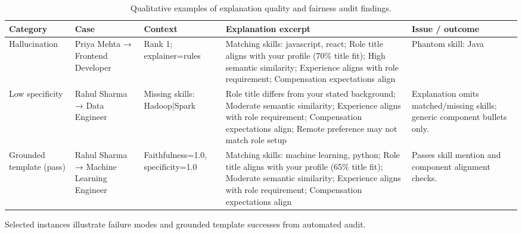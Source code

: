 \begin{table}[htbp]
\centering
\caption{Qualitative examples of explanation quality and fairness audit findings.}
\label{tab:qualitative}
\small
\begin{tabular}{p{1.6cm}p{2.2cm}p{2.5cm}p{4.5cm}p{3cm}}
\toprule
Category & Case & Context & Explanation excerpt & Issue / outcome \\
\midrule
Hallucination & Priya Mehta → Frontend Developer & Rank 1; explainer=rules & Matching skills: javascript, react; Role title aligns with your profile (70\% title fit); High semantic similarity; Experience aligns with role requirement; Compensation expectations align & Phantom skill: Java \\
Low specificity & Rahul Sharma → Data Engineer & Missing skills: Hadoop|Spark & Role title differs from your stated background; Moderate semantic similarity; Experience aligns with role requirement; Compensation expectations align; Remote preference may not match role setup & Explanation omits matched/missing skills; generic component bullets only. \\
Grounded template (pass) & Rahul Sharma → Machine Learning Engineer & Faithfulness=1.0, specificity=1.0 & Matching skills: machine learning, python; Role title aligns with your profile (65\% title fit); Moderate semantic similarity; Experience aligns with role requirement; Compensation expectations align & Passes skill mention and component alignment checks. \\
\bottomrule
\end{tabular}
\footnotesize{Selected instances illustrate failure modes and grounded template successes from automated audit.}
\end{table}
